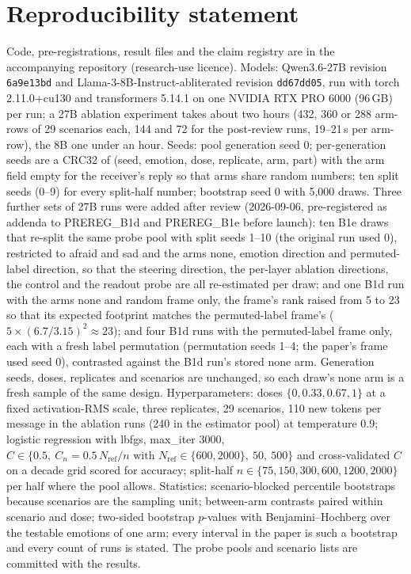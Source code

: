 \documentclass[11pt]{article}
\begin{document}
\section{Reproducibility statement}
\label{app:repro}
Code, pre-registrations, result files and the claim registry are in the accompanying repository (research-use licence). Models: Qwen3.6-27B revision \texttt{6a9e13bd} and Llama-3-8B-Instruct-abliterated revision \texttt{dd67dd05}, run with torch 2.11.0+cu130 and transformers 5.14.1 on one NVIDIA RTX PRO 6000 (96\,GB) per run; a 27B ablation experiment takes about two hours (432, 360 or 288 arm-rows of 29 scenarios each, 144 and 72 for the post-review runs, 19--21\,s per arm-row), the 8B one under an hour. Seeds: pool generation seed 0; per-generation seeds are a CRC32 of (seed, emotion, dose, replicate, arm, part) with the arm field empty for the receiver's reply so that arms share random numbers; ten split seeds (0--9) for every split-half number; bootstrap seed 0 with 5{,}000 draws. Three further sets of 27B runs were added after review (2026-09-06, pre-registered as addenda to PREREG\_B1d and PREREG\_B1e before launch): ten B1e draws that re-split the same probe pool with split seeds 1--10 (the original run used 0), restricted to afraid and sad and the arms none, emotion direction and permuted-label direction, so that the steering direction, the per-layer ablation directions, the control and the readout probe are all re-estimated per draw; and one B1d run with the arms none and random frame only, the frame's rank raised from 5 to 23 so that its expected footprint matches the permuted-label frame's ($5 \times (6.7/3.15)^2 \approx 23$); and four B1d runs with the permuted-label frame only, each with a fresh label permutation (permutation seeds 1--4; the paper's frame used seed 0), contrasted against the B1d run's stored none arm. Generation seeds, doses, replicates and scenarios are unchanged, so each draw's none arm is a fresh sample of the same design. Hyperparameters: doses $\{0, 0.33, 0.67, 1\}$ at a fixed activation-RMS scale, three replicates, 29 scenarios, 110 new tokens per message in the ablation runs (240 in the estimator pool) at temperature 0.9; logistic regression with lbfgs, max\_iter 3000, $C \in \{0.5,\ C_n = 0.5\,N_{\mathrm{ref}}/n \text{ with } N_{\mathrm{ref}} \in \{600, 2000\},\ 50,\ 500\}$ and cross-validated $C$ on a decade grid scored for accuracy; split-half $n \in \{75, 150, 300, 600, 1200, 2000\}$ per half where the pool allows. Statistics: scenario-blocked percentile bootstraps because scenarios are the sampling unit; between-arm contrasts paired within scenario and dose; two-sided bootstrap $p$-values with Benjamini--Hochberg over the testable emotions of one arm; every interval in the paper is such a bootstrap and every count of runs is stated. The probe pools and scenario lists are committed with the results.
\end{document}
